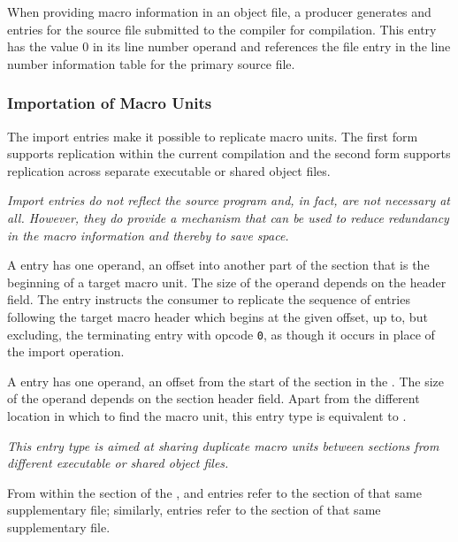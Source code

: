 When providing macro information in an object file,
a producer generates \DWMACROstartfile{} and
\DWMACROendfile{} entries for the source file submitted to
the compiler for compilation. This \DWMACROstartfile{} entry
has the value 0 in its line number operand and references
the file entry in the line number information table for the
primary source file.

\subsubsection{Importation of Macro Units}
\label{chap:importationofmacrounits}
The import entries make it possible to replicate macro units.
The first form supports replication within the current compilation
and the second form supports replication across separate 
executable or shared object files.

\textit{Import entries do not reflect the source program
and, in fact, are not necessary at all. However, they do
provide a mechanism that can be used to reduce redundancy
in the macro information and thereby to save space.}

\begin{enumerate}[1. ]

\itembfnl{\DWMACROimportTARG{}}
A \DWMACROimportNAME{} entry has one operand, an offset into
another part of the \dotdebugmacro{} section that is
the beginning of a target macro unit. The size of the operand
depends on the header \HFNoffsetsizeflag{} field.  The
\DWMACROimportNAME{} entry instructs the consumer to
replicate the sequence of entries following the target macro 
header which begins at the given 
\dotdebugmacro{} offset, up to, but excluding,
the terminating entry with opcode \texttt{0},
as though it occurs in place of the import operation.

\itembfnl{\DWMACROimportsupTARG}
A \DWMACROimportsupNAME{} entry has one operand, an 
offset from the start of the \dotdebugmacro{} section in the 
.  
The size of the operand depends on the section header 
\HFNoffsetsizeflag{} field. 
Apart from the different location in which to find the macro unit,
this entry type is equivalent to \DWMACROimport. 

\textit{This entry type is aimed at sharing duplicate 
macro units between \dotdebugmacro{}
sections from different executable or shared object files.}  

From within the \dotdebugmacro{} section of the 
, \DWMACROdefinestrp{} 
and \DWMACROundefstrp{} entries refer to the
\dotdebugstr{} section of that same supplementary file;
similarly, \DWMACROimport{} entries refer to the 
\dotdebugmacro{} section of that same supplementary file.

\end{enumerate}



